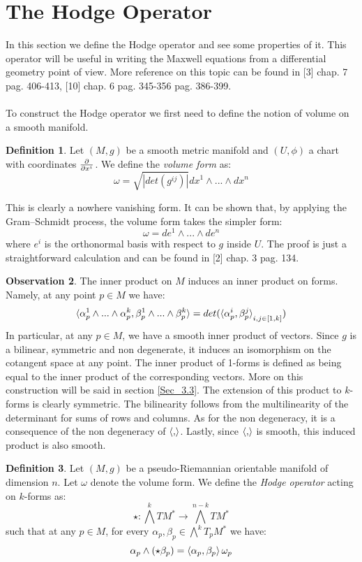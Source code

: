 \documentclass[12pt,a4paper]{report}
\theoremstyle{definition}
\newtheorem{Def}{Definition}[chapter]
\theoremstyle{Theorem}
\theoremstyle{definition}
\theoremstyle{definition}
\newtheorem{Obs}[Def]{Observation}
\begin{document}
	\section{The Hodge Operator}
	In this section we define the Hodge operator and see some properties of it. This operator will be useful in writing the Maxwell equations from a differential geometry point of view. More reference on this topic can be found in [3] chap. 7 pag. 406-413, [10] chap. 6 pag. 345-356 pag. 386-399.\\
	\\
	To construct the Hodge operator we first need to define the notion of volume on a smooth manifold.
	\begin{Def}
		Let $(M,g)$ be a smooth metric manifold and $(U,\phi)$ a chart with coordinates $\partial\over \partial x^i$. We define the \textit{volume form} as:
		$$\omega=\sqrt{|det(g^{ij})|}dx^1\wedge...\wedge dx^n$$
	\end{Def}
	This is clearly a nowhere vanishing form. It can be shown that, by applying the Gram–Schmidt process, the volume form takes the simpler form:
	$$\omega=de^1\wedge...\wedge de^n$$
	where $e^i$ is the orthonormal basis with respect to $g$ inside $U$. The proof is just a straightforward calculation and can be found in [2] chap. 3 pag. 134.
	\begin{Obs}\label{Obs_1.7.1}
		The inner product on $M$ induces an inner product on forms. Namely, at any point $p\in M$ we have:
		$$\braket{\alpha^1_p\wedge...\wedge \alpha^k_p,\beta^1_p\wedge...\wedge\beta^k_p}=det(\braket{\alpha^i_p,\beta^j_p}_{i,j\in[1,k]})$$
		In particular, at any $p\in M$, we have a smooth inner product of vectors. Since $g$ is a bilinear, symmetric and non degenerate, it induces an isomorphism on the cotangent space at any point. The inner product of 1-forms is defined as being equal to the inner product of the corresponding vectors. More on this construction will be said in section \ref{Sec_3.3}.
		The extension of this product to $k$-forms is clearly symmetric. The bilinearity follows from the multilinearity of the determinant for sums of rows and columns. As for the non degeneracy, it is a consequence of the non degeneracy of $\braket{,}$. Lastly, since $\braket{,}$ is smooth, this induced product is also smooth.
	\end{Obs}
	\begin{Def}
		Let $(M,g)$ be a pseudo-Riemannian orientable manifold of dimension $n$. Let $\omega$ denote the volume form. We define the \textit{Hodge operator} acting on $k$-forms as:
		$$\star:\bigwedge^kTM^*\rightarrow \bigwedge^{n-k}TM^*$$
		such that at any $p\in M$, for every $\alpha_p,\beta_p\in\bigwedge^kT_pM^*$ we have:
		$$\alpha_p\wedge(\star\beta_p)=\braket{\alpha_p,\beta_p}\omega_p$$
	\end{Def}
\end{document}
